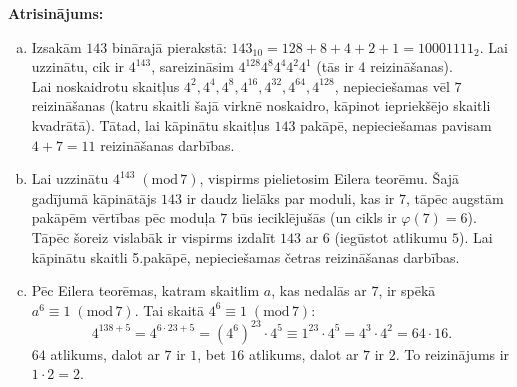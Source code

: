 \documentclass[11pt]{article}
\begin{document}
\vspace{6pt}
{\bf Atrisinājums:}
\begin{enumerate}[(a)]
\item Izsakām $143$ binārajā pierakstā: $143_{10} = 128 + 8 + 4 + 2 + 1 = 10001111_2$.
Lai uzzinātu, cik ir $4^{143}$, sareizināsim $4^{128}4^{8}4^{4}4^{2}4^1$ (tās ir $4$ reizināšanas). \\
Lai noskaidrotu skaitļus $4^2, 4^4, 4^8, 4^{16}, 4^{32}, 4^{64}, 4^{128}$, nepieciešamas vēl $7$ reizināšanas
(katru skaitli šajā virknē noskaidro, kāpinot iepriekšējo skaitli kvadrātā). Tātad, lai kāpinātu skaitļus $143$ pakāpē,
nepieciešamas pavisam $4+7 = 11$ reizināšanas darbības.
\item Lai uzzinātu $4^{143}\;(\text{mod}\,7)$, vispirms pielietosim Eilera teorēmu.
Šajā gadījumā kāpinātājs $143$ ir daudz lielāks par moduli, kas ir $7$, tāpēc augstām pakāpēm
vērtības pēc moduļa $7$ būs ieciklējušās (un cikls ir $\varphi(7) = 6$).\\
Tāpēc šoreiz vislabāk ir vispirms izdalīt $143$ ar $6$ (iegūstot atlikumu $5$).
Lai kāpinātu skaitli 5.pakāpē, nepieciešamas četras reizināšanas darbības.
\item Pēc Eilera teorēmas, katram skaitlim $a$, kas nedalās ar $7$, ir spēkā $a^{6} \equiv 1\;(\text{mod}\,7)$.
Tai skaitā $4^6 \equiv 1\;(\text{mod}\,7)$:
\[ 4^{138+5} = 4^{6\cdot{}23+5} = (4^6)^{23} \cdot{} 4^5 \equiv 1^{23} \cdot{} 4^5 = 4^3 \cdot 4^2 = 64 \cdot 16. \]
$64$ atlikums, dalot ar $7$ ir $1$, bet $16$ atlikums, dalot ar $7$ ir $2$. To reizinājums ir $1 \cdot 2 = 2$.
\end{enumerate}
\end{document}
